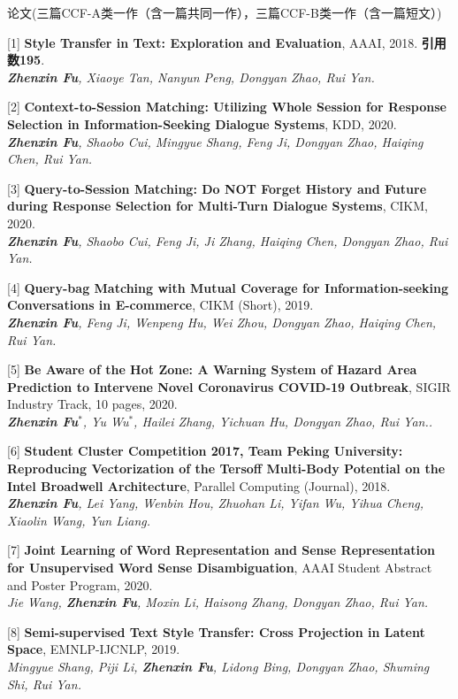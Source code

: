 \documentclass{resume} %
\begin{document}
\begin{rSection}{论文(三篇CCF-A类一作（含一篇共同一作），三篇CCF-B类一作（含一篇短文）)}
    
    [1] \textbf{Style Transfer in Text: Exploration and Evaluation}, AAAI, 2018. \textbf{引用数195}.\\
    {\it \textbf{Zhenxin Fu}, Xiaoye Tan, Nanyun Peng, Dongyan Zhao, Rui Yan.}
  
    [2] \textbf{Context-to-Session Matching: Utilizing Whole Session for Response Selection in Information-Seeking Dialogue Systems}, KDD, 2020. \\
    {\it \textbf{Zhenxin Fu}, Shaobo Cui, Mingyue Shang, Feng Ji, Dongyan Zhao, Haiqing Chen, Rui Yan.}

    [3] \textbf{Query-to-Session Matching: Do NOT Forget History and Future during Response Selection for Multi-Turn Dialogue Systems}, CIKM, 2020. \\
    {\it \textbf{Zhenxin Fu}, Shaobo Cui, Feng Ji, Ji Zhang, Haiqing Chen, Dongyan Zhao, Rui Yan.}
    
    [4] \textbf{Query-bag Matching with Mutual Coverage for Information-seeking Conversations in E-commerce}, CIKM (Short), 2019. \\
    {\it \textbf{Zhenxin Fu}, Feng Ji, Wenpeng Hu, Wei Zhou, Dongyan Zhao, Haiqing Chen, Rui Yan.}

    [5] \textbf{Be Aware of the Hot Zone: A Warning System of Hazard Area Prediction to Intervene Novel Coronavirus COVID-19 Outbreak}, SIGIR Industry Track, 10 pages, 2020. \\
    {\it \textbf{Zhenxin Fu}$^*$, Yu Wu$^*$, Hailei Zhang, Yichuan Hu, Dongyan Zhao, Rui Yan..}

    [6] \textbf{Student Cluster Competition 2017, Team Peking University: Reproducing Vectorization of the Tersoff Multi-Body Potential on the Intel Broadwell Architecture}, Parallel Computing (Journal), 2018. \\
    {\it \textbf{Zhenxin Fu}, Lei Yang, Wenbin Hou, Zhuohan Li, Yifan Wu, Yihua Cheng, Xiaolin Wang, Yun Liang.}

    [7] \textbf{Joint Learning of Word Representation and Sense Representation for Unsupervised Word Sense Disambiguation}, AAAI Student Abstract and Poster Program, 2020. \\
    {\it Jie Wang, \textbf{Zhenxin Fu}, Moxin Li, Haisong Zhang, Dongyan Zhao, Rui Yan.}

    [8] \textbf{Semi-supervised Text Style Transfer: Cross Projection in Latent Space}, EMNLP-IJCNLP, 2019. \\
    {\it Mingyue Shang, Piji Li, \textbf{Zhenxin Fu}, Lidong Bing, Dongyan Zhao, Shuming Shi, Rui Yan.}


\end{rSection}
\end{document}
